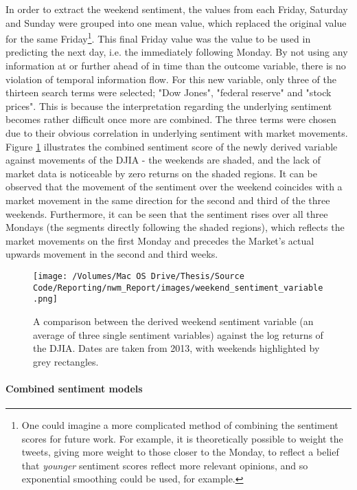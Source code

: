 \documentclass{article}
\begin{document}
In order to extract the weekend sentiment, the values from each Friday, Saturday and Sunday were grouped into one mean value, which replaced the original value for the same Friday\footnote{One could imagine a more complicated method of combining the sentiment scores for future work. For example, it is theoretically possible to weight the tweets, giving more weight to those closer to the Monday, to reflect a belief that \emph{younger} sentiment scores reflect more relevant opinions, and so exponential smoothing could be used, for example.}. This final Friday value was the value to be used in predicting the next day, i.e. the immediately following Monday. By not using any information at or further ahead of in time than the outcome variable, there is no violation of temporal information flow. For this new variable, only three of the thirteen search terms were selected; "Dow Jones", "federal reserve" and "stock prices". This is because the interpretation regarding the underlying sentiment becomes rather difficult once more are combined. The three terms were chosen due to their obvious correlation in underlying sentiment with market movements. Figure \ref{fig:wwp} illustrates the combined sentiment score of the newly derived variable against movements of the DJIA - the weekends are shaded, and the lack of market data is noticeable by zero returns on the shaded regions. It can be observed that the movement of the sentiment over the weekend coincides with a market movement in the same direction for the second and third of the three weekends. Furthermore, it can be seen that the sentiment rises over all three Mondays (the segments directly following the shaded regions), which reflects the market movements on the first Monday and precedes the Market's actual upwards movement in the second and third weeks.

\begin{figure}[htb]
\centering
\texttt{[image: /Volumes/Mac OS Drive/Thesis/Source Code/Reporting/nwm\_Report/images/weekend\_sentiment\_variable.png]}
\caption[An illustration of weekend sentiment as a predictor]{\label{fig:wwp}A comparison between the derived weekend sentiment variable (an average of three single sentiment variables) against the log returns of the DJIA. Dates are taken from 2013, with weekends highlighted by grey rectangles.}
\end{figure}


\paragraph{Combined sentiment models \label{combined-sent}}
\label{sec-6-2-3-2}
\end{document}
